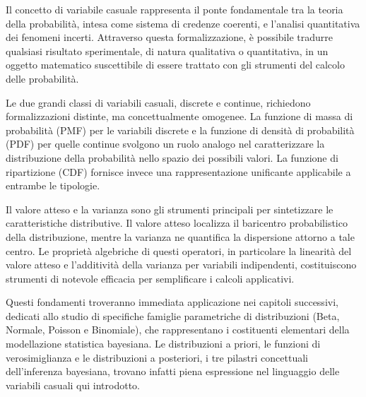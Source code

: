 \documentclass[
  letterpaper,
  DIV=11,
  numbers=noendperiod,
  oneside]{scrreprt}
\theoremstyle{definition}
\theoremstyle{plain}
\theoremstyle{definition}
\theoremstyle{remark}
\begin{document}

Il concetto di variabile casuale rappresenta il ponte fondamentale tra
la teoria della probabilità, intesa come sistema di credenze coerenti, e
l'analisi quantitativa dei fenomeni incerti. Attraverso questa
formalizzazione, è possibile tradurre qualsiasi risultato sperimentale,
di natura qualitativa o quantitativa, in un oggetto matematico
suscettibile di essere trattato con gli strumenti del calcolo delle
probabilità.

Le due grandi classi di variabili casuali, discrete e continue,
richiedono formalizzazioni distinte, ma concettualmente omogenee. La
funzione di massa di probabilità (PMF) per le variabili discrete e la
funzione di densità di probabilità (PDF) per quelle continue svolgono un
ruolo analogo nel caratterizzare la distribuzione della probabilità
nello spazio dei possibili valori. La funzione di ripartizione (CDF)
fornisce invece una rappresentazione unificante applicabile a entrambe
le tipologie.

Il valore atteso e la varianza sono gli strumenti principali per
sintetizzare le caratteristiche distributive. Il valore atteso localizza
il baricentro probabilistico della distribuzione, mentre la varianza ne
quantifica la dispersione attorno a tale centro. Le proprietà algebriche
di questi operatori, in particolare la linearità del valore atteso e
l'additività della varianza per variabili indipendenti, costituiscono
strumenti di notevole efficacia per semplificare i calcoli applicativi.

Questi fondamenti troveranno immediata applicazione nei capitoli
successivi, dedicati allo studio di specifiche famiglie parametriche di
distribuzioni (Beta, Normale, Poisson e Binomiale), che rappresentano i
costituenti elementari della modellazione statistica bayesiana. Le
distribuzioni a priori, le funzioni di verosimiglianza e le
distribuzioni a posteriori, i tre pilastri concettuali dell'inferenza
bayesiana, trovano infatti piena espressione nel linguaggio delle
variabili casuali qui introdotto.
\end{document}
